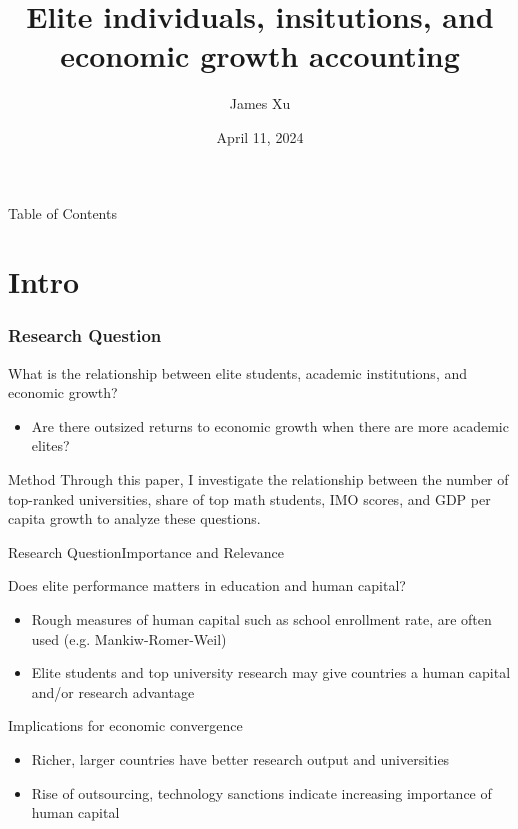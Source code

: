 \documentclass[10pt]{beamer}
\title{Elite individuals, insitutions, and economic growth accounting}
\author{James Xu}
\institute{ECON 442, Duke University}
\date{April 11, 2024}
\begin{document}

\frame{\titlepage}

\begin{frame}{Table of Contents}
    \tableofcontents
\end{frame}
\section{Intro}
\begin{frame}
    \frametitle{Research Question}
    \begin{block}{What is the relationship between elite students, academic institutions, and economic growth?}
        \begin{itemize}
            \item Are there outsized returns to economic growth when there are more academic elites?
        \end{itemize}
    \end{block}
    \begin{exampleblock}{Method}
        Through this paper, I investigate the relationship between the number of top-ranked universities, share of top math students,
        IMO scores, and GDP per capita growth to analyze these questions.
    \end{exampleblock}
\end{frame}

\begin{frame}{Research Question}{Importance and Relevance}
    \begin{block}{Does elite performance matters in education and human capital?}
        \begin{itemize}
            \item Rough measures of human capital such as school enrollment rate, are often used (e.g. Mankiw-Romer-Weil)
            \item Elite students and top university research may give countries a human capital and/or research advantage
        \end{itemize}
    \end{block}

    \begin{block}{Implications for economic convergence}
        \begin{itemize}
            \item Richer, larger countries have better research output and universities
            \item Rise of outsourcing, technology sanctions indicate increasing importance of human capital
        \end{itemize}
        
    \end{block}
\end{frame}
\end{document}
